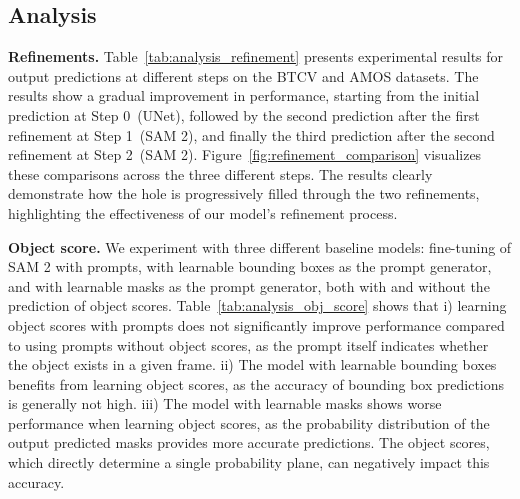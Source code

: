 \subsection{Analysis}
\noindent \textbf{Refinements.}
Table~\ref{tab:analysis_refinement} presents experimental results for output predictions at different steps on the BTCV and AMOS datasets. The results show a gradual improvement in performance, starting from the initial prediction at Step 0~(UNet), followed by the second prediction after the first refinement at Step 1~(SAM 2), and finally the third prediction after the second refinement at Step 2~(SAM 2). 
Figure~\ref{fig:refinement_comparison} visualizes these comparisons across the three different steps. The results clearly demonstrate how the hole is progressively filled through the two refinements, highlighting the effectiveness of our model's refinement process.

\noindent \textbf{Object score.} 
We experiment with three different baseline models: fine-tuning of SAM 2 with prompts, with learnable bounding boxes as the prompt generator, and with learnable masks as the prompt generator, both with and without the prediction of object scores. Table~\ref{tab:analysis_obj_score} shows that i) learning object scores with prompts does not significantly improve performance compared to using prompts without object scores, as the prompt itself indicates whether the object exists in a given frame. ii) The model with learnable bounding boxes benefits from learning object scores, as the accuracy of bounding box predictions is generally not high. iii) The model with learnable masks shows worse performance when learning object scores, as the probability distribution of the output predicted masks provides more accurate predictions. The object scores, which directly determine a single probability plane, can negatively impact this accuracy.

\begin{table}
    \vspace{-0.6cm}
    \centering
    \caption{Experiments for different input patch sizes on BTCV.}
    \label{tab:analysis_patch_size}
\end{table}

